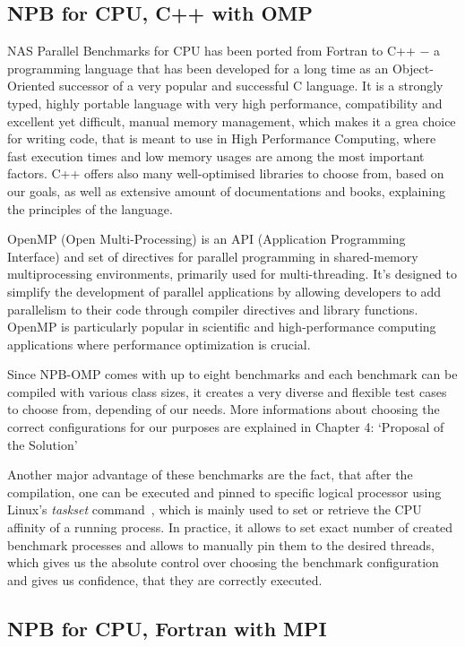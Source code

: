 \subsection{NPB for CPU, C++ with OMP}

NAS Parallel Benchmarks for CPU has been ported from Fortran to C++ $-$ a programming
language that has been developed for a long time as an Object-Oriented successor of
a very popular and successful C language. It is a strongly typed, highly portable
language with very high performance, compatibility and excellent yet difficult,
manual memory management, which makes it a grea choice for writing code, that
is meant to use in High Performance Computing, where fast execution times and low
memory usages are among the most important factors. C++ offers also many 
well-optimised libraries to choose from, based on our goals, as well as extensive
amount of documentations and books, explaining the principles of the language.

OpenMP (Open Multi-Processing) is an API (Application Programming Interface)
and set of directives for parallel programming in shared-memory multiprocessing
environments, primarily used for multi-threading. It's designed to simplify
the development of parallel applications by allowing developers to add parallelism
to their code through compiler directives and library functions. OpenMP is
particularly popular in scientific and high-performance computing applications
where performance optimization is crucial.

Since NPB-OMP comes with up to eight benchmarks and each benchmark can be compiled
with various class sizes, it creates a very diverse and flexible test cases to
choose from, depending of our needs. More informations about choosing the correct
configurations for our purposes are explained in Chapter 4: `Proposal of the
Solution'

Another major advantage of these benchmarks are the fact, that after the
compilation, one can be executed and pinned to specific logical processor using
Linux's \emph{taskset} command~\cite{Linux_taskset}, which is mainly used to
set or retrieve the CPU affinity of a running process. In practice, it allows
to set exact number of created benchmark processes and allows to manually pin
them to the desired threads, which gives us the absolute control over choosing
the benchmark configuration and gives us confidence, that they are correctly
executed.

\newpage

\subsection{NPB for CPU, Fortran with MPI}

